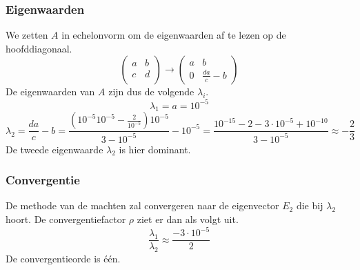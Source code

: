 \documentclass[examenvragen.tex]{subfiles}
\begin{document}
\subsubsection{Eigenwaarden}
We zetten $A$ in echelonvorm om de eigenwaarden af te lezen op de hoofddiagonaal.
\[
\begin{pmatrix}
a & b\\
c & d\\
\end{pmatrix}
\longrightarrow
\begin{pmatrix}
a & b\\
0 & \frac{da}{c}-b
\end{pmatrix}
\]
De eigenwaarden van $A$ zijn dus de volgende $\lambda_i$.
\[
\lambda_1 = a = 10^{-5}
\]
\[
\lambda_2 = \frac{da}{c}-b
= \frac{(10^{-5}10^{-5}-\frac{2}{10^{-5}})10^{-5}}{3-10^{-5}}-10^{-5}
= \frac{10^{-15}-2-3\cdot10^{-5}+10^{-10}}{3-10^{-5}} \approx -\frac{2}{3}
\]
De tweede eigenwaarde $\lambda_2$ is hier dominant. 
\subsubsection{Convergentie}
De methode van de machten zal convergeren naar de eigenvector $E_2$ die bij $\lambda_2$ hoort. De convergentiefactor $\rho$ ziet er dan als volgt uit.
\[
\frac{\lambda_1}{\lambda_2} \approx \frac{-3\cdot 10^{-5}}{2}
\]
De convergentieorde is \'e\'en.
\end{document}
